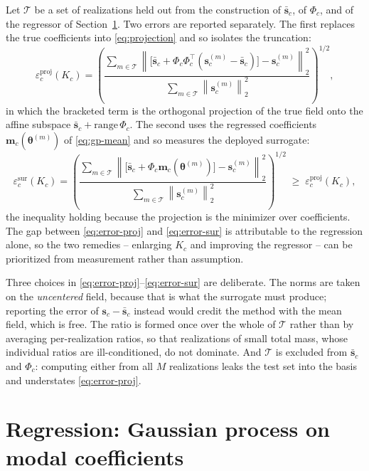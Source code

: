 \documentclass[11pt]{article}
\newcommand{\bs}[1]{\boldsymbol{#1}}
\newcommand{\norm}[1]{\left\lVert #1 \right\rVert}
\begin{document}
Let $\mathcal{T}$ be a set of realizations held out from the construction of
$\bar{\bs{s}}_c$, of $\Phi_c$, and of the regressor of Section~\ref{sec:gp}. Two errors are
reported separately. The first replaces the true coefficients into
\eqref{eq:projection} and so isolates the truncation:
\begin{equation}
  \varepsilon^{\text{proj}}_c(K_c) = \left(
  \frac{\sum_{m \in \mathcal{T}} \norm{
    \big[ \bar{\bs{s}}_c + \Phi_c \Phi_c^{\top}
    ( \bs{s}_c^{(m)} - \bar{\bs{s}}_c ) \big] - \bs{s}_c^{(m)} }_2^2 }{
  \sum_{m \in \mathcal{T}} \norm{ \bs{s}_c^{(m)} }_2^2 } \right)^{1/2} ,
  \label{eq:error-proj}
\end{equation}
in which the bracketed term is the orthogonal projection of the true field onto the affine
subspace $\bar{\bs{s}}_c + \mathrm{range}\,\Phi_c$. The second uses the regressed
coefficients $\bs{m}_c(\bs{\theta}^{(m)})$ of \eqref{eq:gp-mean} and so measures the
deployed surrogate:
\begin{equation}
  \varepsilon^{\text{sur}}_c(K_c) = \left(
  \frac{\sum_{m \in \mathcal{T}} \norm{
    \big[ \bar{\bs{s}}_c + \Phi_c \bs{m}_c(\bs{\theta}^{(m)}) \big]
    - \bs{s}_c^{(m)} }_2^2 }{
  \sum_{m \in \mathcal{T}} \norm{ \bs{s}_c^{(m)} }_2^2 } \right)^{1/2}
  \; \geq \; \varepsilon^{\text{proj}}_c(K_c) ,
  \label{eq:error-sur}
\end{equation}
the inequality holding because the projection is the minimizer over coefficients. The gap
between \eqref{eq:error-proj} and \eqref{eq:error-sur} is attributable to the regression
alone, so the two remedies -- enlarging $K_c$ and improving the regressor -- can be
prioritized from measurement rather than assumption.

Three choices in \eqref{eq:error-proj}--\eqref{eq:error-sur} are deliberate. The norms are
taken on the \emph{uncentered} field, because that is what the surrogate must produce;
reporting the error of $\bs{s}_c - \bar{\bs{s}}_c$ instead would credit the method with the
mean field, which is free. The ratio is formed once over the whole of $\mathcal{T}$ rather
than by averaging per-realization ratios, so that realizations of small total mass, whose
individual ratios are ill-conditioned, do not dominate. And $\mathcal{T}$ is excluded from
$\bar{\bs{s}}_c$ and $\Phi_c$: computing either from all $M$ realizations leaks the test set
into the basis and understates \eqref{eq:error-proj}.

\section{Regression: Gaussian process on modal coefficients}
\label{sec:gp}
\end{document}
